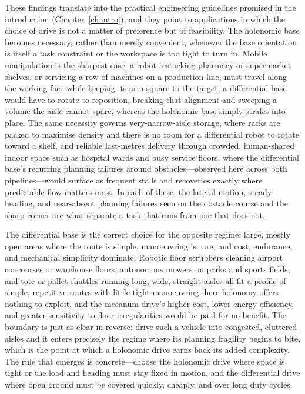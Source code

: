 These findings translate into the practical engineering guidelines promised in the introduction
(Chapter~\ref{ch:intro}), and they point to applications in which the choice of drive is not a
matter of preference but of feasibility. The holonomic base becomes necessary, rather than merely
convenient, whenever the base orientation is itself a task constraint or the workspace is too tight
to turn in. Mobile manipulation is the sharpest case: a robot restocking pharmacy or supermarket
shelves, or servicing a row of machines on a production line, must travel along the working face
while keeping its arm square to the target; a differential base would have to rotate to reposition,
breaking that alignment and sweeping a volume the aisle cannot spare, whereas the holonomic base
simply strafes into place. The same necessity governs very-narrow-aisle storage, where racks are
packed to maximise density and there is no room for a differential robot to rotate toward a shelf,
and reliable last-metres delivery through crowded, human-shared indoor space such as hospital wards
and busy service floors, where the differential base's recurring planning failures around
obstacles---observed here across both pipelines---would surface as frequent stalls and recoveries
exactly where predictable flow matters most. In each of these, the lateral motion, steady heading,
and near-absent planning failures seen on the obstacle course and the sharp corner are what separate
a task that runs from one that does not.

The differential base is the correct choice for the opposite regime: large, mostly open areas where
the route is simple, manoeuvring is rare, and cost, endurance, and mechanical simplicity dominate.
Robotic floor scrubbers cleaning airport concourses or warehouse floors, autonomous
mowers on parks and sports fields, and tote or pallet shuttles running long, wide, straight
aisles all fit a profile of simple, repetitive routes with little tight manoeuvring: here
holonomy offers nothing to exploit, and the mecanum drive's higher cost, lower energy
efficiency, and greater sensitivity to floor irregularities would be paid for no benefit.
The boundary is just as clear in reverse: drive
such a vehicle into congested, cluttered aisles and it enters precisely the regime where its
planning fragility begins to bite, which is the point at which a holonomic drive earns back its
added complexity. The rule that emerges is concrete---choose the holonomic drive where space is
tight or the load and heading must stay fixed in motion, and the differential drive where open
ground must be covered quickly, cheaply, and over long duty cycles.

